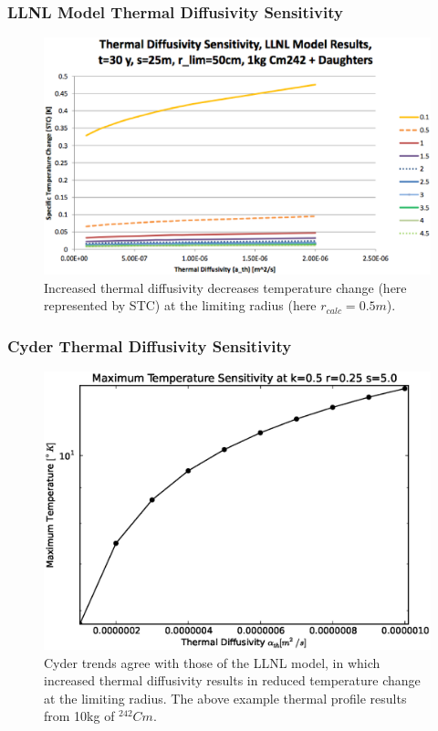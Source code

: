 
\begin{frame}[ctb!]
\frametitle{LLNL Model Thermal Diffusivity Sensitivity}
\begin{figure}[htbp!]
\begin{center}
\includegraphics[height=0.7\textheight]{./thermal_demonstration/diffusivity/diffusivity.eps}
\end{center}
\caption[$K_{th}$ Sensitivity to $\alpha_{th}$]{Increased thermal 
diffusivity decreases temperature change (here represented by STC) at the 
limiting radius (here $r_{calc} = 0.5m$).}
\label{fig:Cm242alpha_kth_low}
\end{figure}
\end{frame}

\begin{frame}[ctb!]
\frametitle{Cyder Thermal Diffusivity Sensitivity}
\begin{figure}[htbp!]
\begin{center}
\includegraphics[height=0.7\textheight]{./thermal_demonstration/diffusivity/diffusivity_cyder.eps}
\caption[$\alpha_{th}$ Sensitivity in Cyder]{Cyder trends agree with those of 
the LLNL model, in which increased thermal diffusivity results in reduced 
temperature change at the limiting radius. The above example thermal profile 
results from 10kg of $^{242}Cm$.} 
\label{fig:ar}
\end{center}
\end{figure}
\end{frame}

